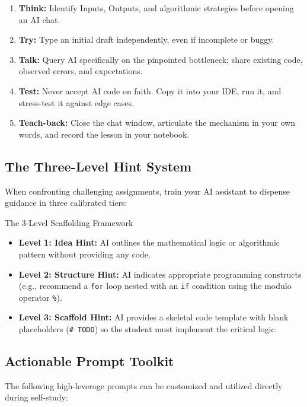 \documentclass[11pt,a4paper]{article}
\begin{document}
\begin{enumerate}[leftmargin=1.5em, itemsep=3pt]
    \item \textbf{Think:} Identify Inputs, Outputs, and algorithmic strategies before opening an AI chat.
    \item \textbf{Try:} Type an initial draft independently, even if incomplete or buggy.
    \item \textbf{Talk:} Query AI specifically on the pinpointed bottleneck; share existing code, observed errors, and expectations.
    \item \textbf{Test:} Never accept AI code on faith. Copy it into your IDE, run it, and stress-test it against edge cases.
    \item \textbf{Teach-back:} Close the chat window, articulate the mechanism in your own words, and record the lesson in your notebook.
\end{enumerate}

\subsection{The Three-Level Hint System}
When confronting challenging assignments, train your AI assistant to dispense guidance in three calibrated tiers:

\begin{infobox}{The 3-Level Scaffolding Framework}
\begin{itemize}[leftmargin=1.5em, itemsep=3pt]
    \item \textbf{Level 1: Idea Hint:} AI outlines the mathematical logic or algorithmic pattern without providing any code.
    \item \textbf{Level 2: Structure Hint:} AI indicates appropriate programming constructs (e.g., recommend a \texttt{for} loop nested with an \texttt{if} condition using the modulo operator \texttt{\%}).
    \item \textbf{Level 3: Scaffold Hint:} AI provides a skeletal code template with blank placeholders (\texttt{\# TODO}) so the student must implement the critical logic.
\end{itemize}
\end{infobox}

\subsection{Actionable Prompt Toolkit}
The following high-leverage prompts can be customized and utilized directly during self-study:
\end{document}
